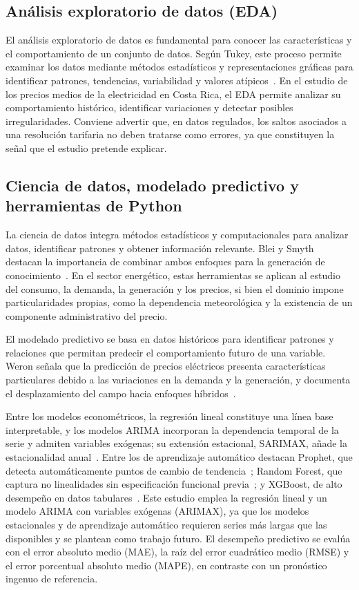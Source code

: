 \documentclass[conference]{IEEEtran}
\begin{document}
\subsection{An\'alisis exploratorio de datos (EDA)}

El an\'alisis exploratorio de datos es fundamental para conocer las caracter\'isticas y el comportamiento de un conjunto de datos. Seg\'un Tukey, este proceso permite examinar los datos mediante m\'etodos estad\'isticos y representaciones gr\'aficas para identificar patrones, tendencias, variabilidad y valores at\'ipicos~\cite{r10}. En el estudio de los precios medios de la electricidad en Costa Rica, el EDA permite analizar su comportamiento hist\'orico, identificar variaciones y detectar posibles irregularidades. Conviene advertir que, en datos regulados, los saltos asociados a una resoluci\'on tarifaria no deben tratarse como errores, ya que constituyen la se\~nal que el estudio pretende explicar.

\subsection{Ciencia de datos, modelado predictivo y herramientas de Python}

La ciencia de datos integra métodos estadísticos y computacionales para analizar datos, identificar patrones y obtener información relevante. Blei y Smyth destacan la importancia de combinar ambos enfoques para la generación de conocimiento~\cite{r11}. En el sector energético, estas herramientas se aplican al estudio del consumo, la demanda, la generación y los precios, si bien el dominio impone particularidades propias, como la dependencia meteorológica y la existencia de un componente administrativo del precio.

El modelado predictivo se basa en datos históricos para identificar patrones y relaciones que permitan predecir el comportamiento futuro de una variable. Weron señala que la predicción de precios eléctricos presenta características particulares debido a las variaciones en la demanda y la generación, y documenta el desplazamiento del campo hacia enfoques híbridos~\cite{r12}.

Entre los modelos econométricos, la regresión lineal constituye una línea base interpretable, y los modelos ARIMA incorporan la dependencia temporal de la serie y admiten variables exógenas; su extensión estacional, SARIMAX, añade la estacionalidad anual~\cite{r13}. Entre los de aprendizaje automático destacan Prophet, que detecta automáticamente puntos de cambio de tendencia~\cite{r14}; Random Forest, que captura no linealidades sin especificación funcional previa~\cite{r15}; y XGBoost, de alto desempeño en datos tabulares~\cite{r16}. Este estudio emplea la regresión lineal y un modelo ARIMA con variables exógenas (ARIMAX), ya que los modelos estacionales y de aprendizaje automático requieren series más largas que las disponibles y se plantean como trabajo futuro. El desempeño predictivo se evalúa con el error absoluto medio (MAE), la raíz del error cuadrático medio (RMSE) y el error porcentual absoluto medio (MAPE), en contraste con un pronóstico ingenuo de referencia.
\end{document}
